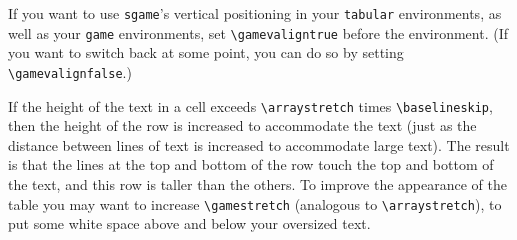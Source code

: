 \documentclass[12pt]{article}
\begin{document}
{If you want to use \verb+sgame+'s vertical positioning in your \verb+tabular+
environments, as well as your \verb+game+ environments, set
\verb+\gamevaligntrue+ before the environment.  (If you want to switch back at
some point, you can do so by setting \verb+\gamevalignfalse+.)

If the height of the text in a cell exceeds \verb+\arraystretch+ times
\verb+\baselineskip+, then the height of the row is increased to accommodate 
the text (just as the distance between lines of text is increased to 
accommodate large text).  The result is that the lines at the top and bottom
of the row touch the top and bottom of the text, and this row is taller than
the others.  To improve the appearance of the table you may want to increase
\verb+\gamestretch+ (analogous to \verb+\arraystretch+), to put some white 
space above and below your oversized text.

}
\end{document}
